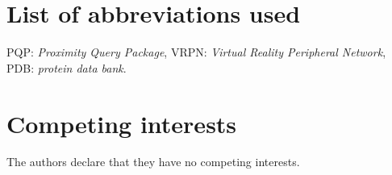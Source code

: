 \documentclass[twocolumn]{bmcart}%
\begin{document}
\begin{backmatter}

\section*{List of abbreviations used}
PQP: \textit{Proximity Query Package}, VRPN: \textit{Virtual Reality Peripheral Network}, PDB: \textit{protein data bank}.

\section*{Competing interests}
The authors declare that they have no competing interests.








\end{backmatter}
\end{document}
